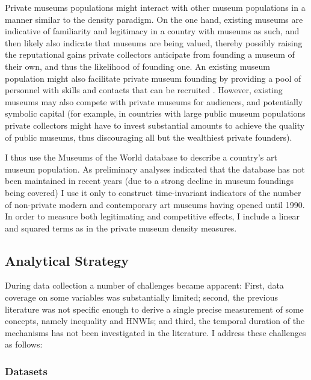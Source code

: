 \documentclass[11pt]{article}
\begin{document}
Private museums populations might interact with other museum populations in a manner similar to the density paradigm. 
On the one hand, existing museums are indicative of familiarity and legitimacy in a country with museums as such, and then likely also indicate that museums are being valued, thereby possibly raising the reputational gains private collectors anticipate from founding a museum of their own, and thus the likelihood of founding one.
An existing museum population might also facilitate private museum founding by providing a pool of personnel with skills and contacts that can be recruited \parencite{Quemin_2020_power}.
However, existing museums may also compete with private museums for audiences, and potentially symbolic capital (for example, in countries with large public museum populations private collectors might have to invest substantial amounts to achieve the quality of public museums, thus discouraging all but the wealthiest private founders). 


I thus use the Museums of the World database \parencite{deGruyter_2021_MOW} to describe a country's art museum population. 
As preliminary analyses indicated that the database has not been maintained in recent years (due to a strong decline in museum foundings being covered) I use it only to construct time-invariant indicators of the number of non-private modern and contemporary art museums having opened until 1990.
In order to measure both legitimating and competitive effects, I include a linear and squared terms as in the private museum density measures.



\subsection*{Analytical Strategy}


During data collection a number of challenges became apparent:
First, data coverage on some variables was substantially limited; second, the previous literature was not specific enough to derive a single precise measurement of some concepts, namely inequality and HNWIs; and third, the temporal duration of the mechanisms has not been investigated in the literature. 
I address these challenges as follows: 

\subsubsection*{Datasets}
\end{document}
